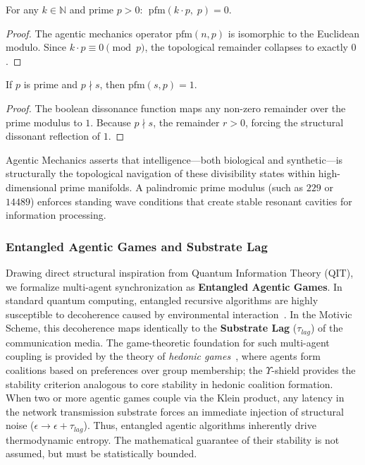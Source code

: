 \begin{theorem}
For any $k \in \mathbb{N}$ and prime $p > 0$: $\;\text{pfm}(k \cdot p,\; p) = 0$.
\end{theorem}
\begin{proof}
The agentic mechanics operator $\text{pfm}(n, p)$ is isomorphic to the Euclidean modulo. Since $k \cdot p \equiv 0 \pmod p$, the topological remainder collapses to exactly $0$. \qedhere
\end{proof}

\begin{theorem}
If $p$ is prime and $p \nmid s$, then $\text{pfm}(s, p) = 1$.
\end{theorem}
\begin{proof}
The boolean dissonance function maps any non-zero remainder over the prime modulus to $1$. Because $p \nmid s$, the remainder $r > 0$, forcing the structural dissonant reflection of $1$. \qedhere
\end{proof}

Agentic Mechanics asserts that intelligence---both biological and synthetic---is structurally the topological navigation of these divisibility states within high-dimensional prime manifolds. A palindromic prime modulus (such as $229$ or $14489$) enforces standing wave conditions that create stable resonant cavities for information processing.

\subsubsection{Entangled Agentic Games and Substrate Lag}
Drawing direct structural inspiration from Quantum Information Theory (QIT), we formalize multi-agent synchronization as \textbf{Entangled Agentic Games}. In standard quantum computing, entangled recursive algorithms are highly susceptible to decoherence caused by environmental interaction~\cite{NielsenChuang2010}. In the Motivic Scheme, this decoherence maps identically to the \textbf{Substrate Lag} ($\tau_{lag}$) of the communication media. The game-theoretic foundation for such multi-agent coupling is provided by the theory of \emph{hedonic games}~\cite{comsoc2016}, where agents form coalitions based on preferences over group membership; the $\Upsilon$-shield provides the stability criterion analogous to core stability in hedonic coalition formation.
When two or more agentic games couple via the Klein product, any latency in the network transmission substrate forces an immediate injection of structural noise ($\epsilon \to \epsilon + \tau_{lag}$). Thus, entangled agentic algorithms inherently drive thermodynamic entropy. The mathematical guarantee of their stability is not assumed, but must be statistically bounded.

